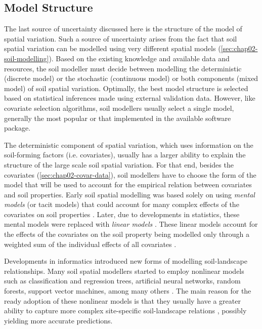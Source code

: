 \subsection{Model Structure}

The last source of uncertainty discussed here is the structure of the model of spatial variation. Such a 
source of uncertainty arises from the fact that soil spatial variation can be modelled using very different 
spatial models (\autoref{sec:chap02-soil-modelling}). Based on the existing knowledge and available data and 
resources, the soil modeller must decide between modelling the deterministic (discrete model) or the 
stochastic (continuous model) or both components (mixed model) of soil spatial variation. Optimally, the best 
model structure is selected based on statistical inferences made using external validation data. However, like 
covariate selection algorithms, soil modellers usually select a single model, generally the most popular or 
that implemented in the available software package.

The deterministic component of spatial variation, which uses information on the soil-forming factors (i.e. 
covariates), usually has a larger ability to explain the structure of the large scale soil spatial variation. 
For that end, besides the covariates (\autoref{sec:chap02-covar-data}), soil modellers have to choose the form 
of the model that will be used to account for the empirical relation between covariates and soil properties. 
Early soil spatial modelling was based solely on using \emph{mental models} (or tacit models) that could 
account for many complex effects of the covariates on soil properties \cite{Hudson1992}. Later, due to 
developments in statistics, these mental models were replaced with \emph{linear models} \cite{MooreEtAl1993, 
OdehEtAl1994}. These linear models account for the effects of the covariates on the soil property being 
modelled only through a weighted sum of the individual effects of all covariates \cite{Harrell2001a}. 

Developments in informatics introduced new forms of modelling soil-landscape relationships. Many soil spatial 
modellers started to employ nonlinear models such as classification and regression trees, artificial neural 
networks, random forests, support vector machines, among many others \cite{McBratneyEtAl2000, HeungEtAl2016}. 
The main reason for the ready adoption of these nonlinear models is that they usually have a greater ability to 
capture more complex site-specific soil-landscape relations \cite{Grunwald2009}, possibly yielding more 
accurate predictions.

